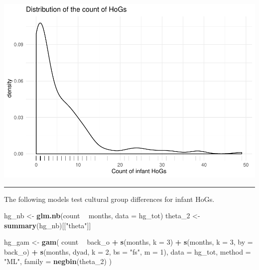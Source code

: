 \documentclass[]{article}
\newenvironment{Shaded}{\begin{snugshade}}{\end{snugshade}}
\newcommand{\DataTypeTok}[1]{\textcolor[rgb]{0.13,0.29,0.53}{#1}}
\newcommand{\DecValTok}[1]{\textcolor[rgb]{0.00,0.00,0.81}{#1}}
\newcommand{\KeywordTok}[1]{\textcolor[rgb]{0.13,0.29,0.53}{\textbf{#1}}}
\newcommand{\NormalTok}[1]{#1}
\newcommand{\OperatorTok}[1]{\textcolor[rgb]{0.81,0.36,0.00}{\textbf{#1}}}
\newcommand{\StringTok}[1]{\textcolor[rgb]{0.31,0.60,0.02}{#1}}
\begin{document}
\includegraphics{supplement_files/figure-latex/hog-1.pdf}

\begin{center}\rule{0.5\linewidth}{\linethickness}\end{center}

The following models test cultural group differences for infant HoGs.

\begin{Shaded}
\begin{Highlighting}[]
\NormalTok{hg_nb <-}\StringTok{ }\KeywordTok{glm.nb}\NormalTok{(count }\OperatorTok{~}\StringTok{ }\NormalTok{months, }\DataTypeTok{data =}\NormalTok{ hg_tot)}
\NormalTok{theta_}\DecValTok{2}\NormalTok{ <-}\StringTok{ }\KeywordTok{summary}\NormalTok{(hg_nb)[[}\StringTok{"theta"}\NormalTok{]]}

\NormalTok{hg_gam <-}\StringTok{ }\KeywordTok{gam}\NormalTok{(}
\NormalTok{  count }\OperatorTok{~}
\StringTok{    }\NormalTok{back_o }\OperatorTok{+}
\StringTok{    }\KeywordTok{s}\NormalTok{(months, }\DataTypeTok{k =} \DecValTok{3}\NormalTok{) }\OperatorTok{+}
\StringTok{    }\KeywordTok{s}\NormalTok{(months, }\DataTypeTok{k =} \DecValTok{3}\NormalTok{, }\DataTypeTok{by =}\NormalTok{ back_o) }\OperatorTok{+}
\StringTok{    }\KeywordTok{s}\NormalTok{(months, dyad, }\DataTypeTok{k =} \DecValTok{2}\NormalTok{, }\DataTypeTok{bs =} \StringTok{"fs"}\NormalTok{, }\DataTypeTok{m =} \DecValTok{1}\NormalTok{),}
  \DataTypeTok{data =}\NormalTok{ hg_tot,}
  \DataTypeTok{method =} \StringTok{"ML"}\NormalTok{,}
  \DataTypeTok{family =} \KeywordTok{negbin}\NormalTok{(theta_}\DecValTok{2}\NormalTok{)}
\NormalTok{)}
\end{Highlighting}
\end{Shaded}
\end{document}
